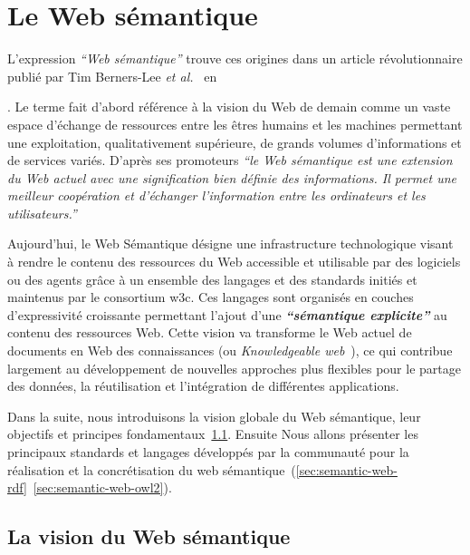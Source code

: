 \chapter{Le Web sémantique}
\label{annexe:semantic-web}

L'expression \emph{``Web sémantique''} trouve ces origines dans un
article révolutionnaire publié par Tim Berners-Lee \emph{et
  al.}~\cite{berners2001semantic} en \date{2001}. Le terme fait
d'abord référence à la vision du Web de demain comme un vaste espace
d'échange de ressources entre les êtres humains et les machines
permettant une exploitation, qualitativement supérieure, de grands
volumes d'informations et de services variés. D'après ses promoteurs
\emph{``le Web sémantique est une extension du Web actuel avec une
  signification bien définie des informations. Il permet une meilleur
  coopération et d'échanger l'information entre les ordinateurs et les
  utilisateurs.''}\medskip

Aujourd'hui, le Web Sémantique désigne une infrastructure
technologique visant à rendre le contenu des ressources du Web
accessible et utilisable par des logiciels ou des agents grâce à un
ensemble des langages et des standards initiés et maintenus par le
consortium \acrshort{w3c}. Ces langages sont organisés en couches
d'expressivité croissante permettant l'ajout d'une
\emph{\textbf{``sémantique explicite''}} au contenu des ressources
Web. Cette vision va transforme le Web actuel de documents en Web des
connaissances (ou \emph{Knowledgeable web}~\cite{decker2000semantic}),
ce qui contribue largement au développement de nouvelles approches
plus flexibles pour le partage des données, la réutilisation et
l'intégration de différentes applications.\medskip

Dans la suite, nous introduisons la vision globale du Web sémantique,
leur objectifs et principes
fondamentaux~\ref{sec:semantic-web-vision}. Ensuite Nous allons
présenter les principaux standards et langages développés par la
communauté pour la réalisation et la concrétisation du web
sémantique~(\ref{sec:semantic-web-rdf}~\ref{sec:semantic-web-owl2}).

\newpage
\section{La vision du Web sémantique}
\label{sec:semantic-web-vision}



